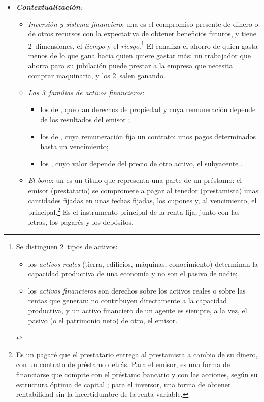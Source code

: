 \documentclass[11pt]{article}
\begin{document}
\begin{itemize}
\item \textbf{\emph{Contextualización}}:
  \begin{itemize}
  \item \emph{Inversión y sistema financiero}: una  es el compromiso presente de dinero o de otros recursos con la expectativa de obtener beneficios futuros, y tiene 2~dimensiones, el \emph{tiempo} y el \emph{riesgo}\nocite{BodieKaneMarcus2021Investments}.\footnote{Se distinguen 2~tipos de activos:
\begin{itemize}
\item los \emph{activos reales} (tierra, edificios, máquinas, conocimiento) determinan la capacidad productiva de una economía y no son el pasivo de nadie;
\item los \emph{activos financieros} son derechos sobre los activos reales o sobre las rentas que generan: no contribuyen directamente a la capacidad productiva, y un activo financiero de un agente es siempre, a la vez, el pasivo (o el patrimonio neto) de otro, el emisor.
\end{itemize}} El  canaliza el ahorro de quien gasta menos de lo que gana hacia quien quiere gastar más: un trabajador que ahorra para su jubilación puede prestar a la empresa que necesita comprar maquinaria, y los 2~salen ganando.
  \item \emph{Las 3~familias de activos financieros}:
    \begin{itemize}
    \item los de , que dan derechos de propiedad y cuya remuneración depende de los resultados del emisor ;
    \item los de , cuya remuneración fija un contrato: unos pagos determinados hasta un vencimiento;
    \item los , cuyo valor depende del precio de otro activo, el subyacente .
    \end{itemize}
  \item \emph{El bono}: un  es un título que representa una parte de un préstamo: el emisor (prestatario) se compromete a pagar al tenedor (prestamista) unas cantidades fijadas en unas fechas fijadas, los cupones y, al vencimiento, el principal.\footnote{Es un pagaré que el prestatario entrega al prestamista a cambio de su dinero, con un contrato de préstamo detrás. Para el emisor, es una forma de financiarse que compite con el préstamo bancario y con las acciones, según su estructura óptima de capital ; para el inversor, una forma de obtener rentabilidad sin la incertidumbre de la renta variable.} Es el instrumento principal de la renta fija, junto con las letras, los pagarés y los depósitos.

\end{itemize}
\end{itemize}
\end{document}
